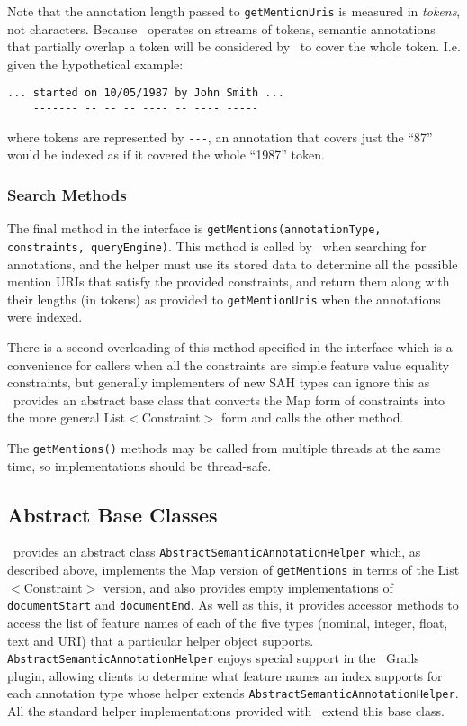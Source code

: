 Note that the annotation length passed to {\tt getMentionUris} is measured in
{\em tokens}, not characters.  Because \Mimir\ operates on streams of tokens,
semantic annotations that partially overlap a token will be considered by
\Mimir\ to cover the whole token.  I.e. given the hypothetical example:

\begin{minipage}{\textwidth}
\begin{verbatim}
... started on 10/05/1987 by John Smith ...
    ------- -- -- -- ---- -- ---- -----
\end{verbatim}
\end{minipage}

where tokens are represented by \verb|---|, an annotation that covers just the
``87'' would be indexed as if it covered the whole ``1987'' token.

\subsubsection*{Search Methods}

The final method in the interface is {\tt getMentions(annotationType,
constraints, queryEngine)}.  This method is called by \Mimir\ when searching
for annotations, and the helper must use its stored data to determine all the
possible mention URIs that satisfy the provided constraints, and return them
along with their lengths (in tokens) as provided to {\tt getMentionUris} when
the annotations were indexed.

There is a second overloading of this method specified in the interface which
is a convenience for callers when all the constraints are simple feature value
equality constraints, but generally implementers of new SAH types can ignore
this as \Mimir\ provides an abstract base class that converts the Map form of
constraints into the more general List$<$Constraint$>$ form and calls the other
method.

The {\tt getMentions()} methods may be called from multiple threads at the same
time, so implementations should be thread-safe.

\subsection{Abstract Base Classes}

\Mimir\ provides an abstract class {\tt AbstractSemanticAnnotationHelper}
which, as described above, implements the Map version of {\tt getMentions} in
terms of the List$<$Constraint$>$ version, and also provides empty
implementations of {\tt documentStart} and {\tt documentEnd}.  As well as this,
it provides accessor methods to access the list of feature names of each of the
five types (nominal, integer, float, text and URI) that a particular helper
object supports.  {\tt AbstractSemanticAnnotationHelper} enjoys special support
in the \Mimir\ Grails plugin, allowing clients to determine what feature names
an index supports for each annotation type whose helper extends
{\tt AbstractSemanticAnnotationHelper}.  All the standard helper
implementations provided with \Mimir\ extend this base class.

